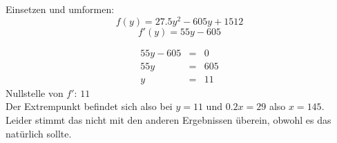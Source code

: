 \documentclass[a4paper,11pt,fleqn]{scrartcl}
\begin{document}
\begin{enumerate}
\begin{enumerate}
                Einsetzen und umformen:
                $$f(y) = 27.5y^2 - 605y + 1512$$
                $$f'(y) = 55y - 605$$


                \begin{eqnarray*}
                    55y - 605 &=& 0\\
                    55y &=& 605\\
                    y &=& 11
                \end{eqnarray*}
                Nullstelle von $f'$: $11$ \\
                Der Extrempunkt befindet sich also bei $y = 11$ und $0.2x = 29$ also $x = 145$.
                Leider stimmt das nicht mit den anderen Ergebnissen überein, obwohl es das natürlich sollte.
        \end{enumerate}
\end{enumerate}
\end{document}
